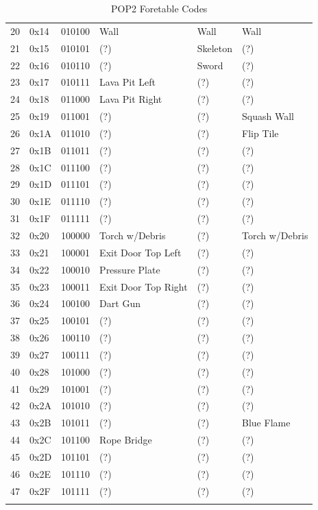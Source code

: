 \documentclass{article}
\begin{document}
\begin{longtable}{llllll}
 20 & 0x14 & 010100 & Wall               & Wall              & Wall \\
 21 & 0x15 & 010101 & (?)                & Skeleton          & (?) \\
 22 & 0x16 & 010110 & (?)                & Sword             & (?) \\
 23 & 0x17 & 010111 & Lava Pit Left      & (?)               & (?) \\
 24 & 0x18 & 011000 & Lava Pit Right     & (?)               & (?) \\
 25 & 0x19 & 011001 & (?)                & (?)               & Squash Wall \\
 26 & 0x1A & 011010 & (?)                & (?)               & Flip Tile \\
 27 & 0x1B & 011011 & (?)                & (?)               & (?) \\
 28 & 0x1C & 011100 & (?)                & (?)               & (?) \\
 29 & 0x1D & 011101 & (?)                & (?)               & (?) \\
 30 & 0x1E & 011110 & (?)                & (?)               & (?) \\
 31 & 0x1F & 011111 & (?)                & (?)               & (?) \\
 32 & 0x20 & 100000 & Torch w/Debris     & (?)               & Torch w/Debris \\
 33 & 0x21 & 100001 & Exit Door Top Left & (?)               & (?) \\
 34 & 0x22 & 100010 & Pressure Plate     & (?)               & (?) \\
 35 & 0x23 & 100011 & Exit Door Top Right& (?)               & (?) \\
 36 & 0x24 & 100100 & Dart Gun           & (?)               & (?) \\
 37 & 0x25 & 100101 & (?)                & (?)               & (?) \\
 38 & 0x26 & 100110 & (?)                & (?)               & (?) \\
 39 & 0x27 & 100111 & (?)                & (?)               & (?) \\
 40 & 0x28 & 101000 & (?)                & (?)               & (?) \\
 41 & 0x29 & 101001 & (?)                & (?)               & (?) \\
 42 & 0x2A & 101010 & (?)                & (?)               & (?) \\
 43 & 0x2B & 101011 & (?)                & (?)               & Blue Flame \\
 44 & 0x2C & 101100 & Rope Bridge        & (?)               & (?) \\
 45 & 0x2D & 101101 & (?)                & (?)               & (?) \\
 46 & 0x2E & 101110 & (?)                & (?)               & (?) \\
 47 & 0x2F & 101111 & (?)                & (?)               & (?) \\
\hline
\caption{POP2 Foretable Codes}
\label{dat2 foretable}
\end{longtable}
\end{document}
